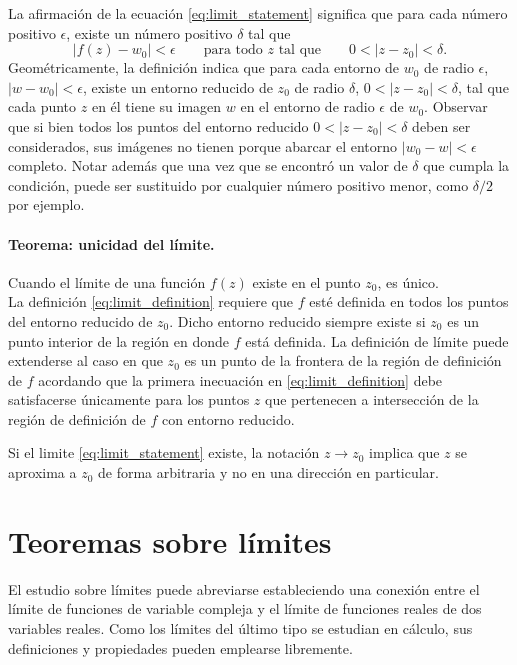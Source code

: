\documentclass[a4paper]{report}
\begin{document}
La afirmación de la ecuación \ref{eq:limit_statement} significa que para cada número positivo \(\epsilon\), existe un número positivo \(\delta\) tal que
\begin{equation}\label{eq:limit_definition}
 |f(z)-w_0|<\epsilon\qquad\textrm{para todo }z\textrm{ tal que}\qquad0<|z-z_0|<\delta. 
\end{equation}
Geométricamente, la definición indica que para cada entorno de \(w_0\) de radio \(\epsilon\), \(|w-w_0|<\epsilon\), existe un entorno reducido de \(z_0\) de radio \(\delta\), \(0<|z-z_0|<\delta\), tal que cada punto \(z\) en él tiene su imagen \(w\) en el entorno de radio \(\epsilon\) de \(w_0\). Observar que si bien todos los puntos del entorno reducido \(0<|z-z_0|<\delta\) deben ser considerados, sus imágenes no tienen porque abarcar el entorno \(|w_0-w|<\epsilon\) completo. Notar además que una vez que se encontró un valor de \(\delta\) que cumpla la condición, puede ser sustituido por cualquier número positivo menor, como \(\delta/2\) por ejemplo.

\paragraph{Teorema: unicidad del límite.} Cuando el límite de una función \(f(z)\) existe en el punto \(z_0\), es único.\\[1ex]

La definición \ref{eq:limit_definition} requiere que \(f\) esté definida en todos los puntos del entorno reducido de \(z_0\). Dicho entorno reducido siempre existe si \(z_0\) es un punto interior de la región en donde \(f\) está definida. La definición de límite puede extenderse al caso en que \(z_0\) es un punto de la frontera de la región de definición de \(f\) acordando que la primera inecuación en \ref{eq:limit_definition} debe satisfacerse únicamente para los puntos \(z\) que pertenecen a intersección de la región de definición de \(f\) con entorno reducido.  

Si el limite \ref{eq:limit_statement} existe, la notación \(z\to z_0\) implica que \(z\) se aproxima a \(z_0\) de forma arbitraria y no en una dirección en particular. 

\section{Teoremas sobre límites}\label{sec:limits_theorems}

El estudio sobre límites puede abreviarse estableciendo una conexión entre el límite de funciones de variable compleja y el límite de funciones reales de dos variables reales. Como los límites del último tipo se estudian en cálculo, sus definiciones y propiedades pueden emplearse libremente. 
\end{document}
